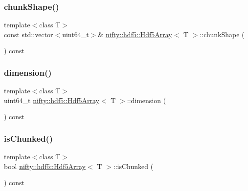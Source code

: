 \subsubsection{\texorpdfstring{chunk\+Shape()}{chunkShape()}\hspace{0.1cm}{\footnotesize\ttfamily [2/2]}}
{\footnotesize\ttfamily template$<$class T$>$ \\
const std\+::vector$<$uint64\+\_\+t$>$\& \hyperlink{classnifty_1_1hdf5_1_1Hdf5Array}{nifty\+::hdf5\+::\+Hdf5\+Array}$<$ T $>$\+::chunk\+Shape (\begin{DoxyParamCaption}{ }\end{DoxyParamCaption}) const\hspace{0.3cm}{\ttfamily [inline]}}

\mbox{\label{classnifty_1_1hdf5_1_1Hdf5Array_a4c5acf1a05db2bccd714c64a1389a287}} 
\subsubsection{\texorpdfstring{dimension()}{dimension()}}
{\footnotesize\ttfamily template$<$class T$>$ \\
uint64\+\_\+t \hyperlink{classnifty_1_1hdf5_1_1Hdf5Array}{nifty\+::hdf5\+::\+Hdf5\+Array}$<$ T $>$\+::dimension (\begin{DoxyParamCaption}{ }\end{DoxyParamCaption}) const\hspace{0.3cm}{\ttfamily [inline]}}

\mbox{\label{classnifty_1_1hdf5_1_1Hdf5Array_a4ae66ef4e9ba86c5f311c6476fb1b422}} 
\subsubsection{\texorpdfstring{is\+Chunked()}{isChunked()}}
{\footnotesize\ttfamily template$<$class T$>$ \\
bool \hyperlink{classnifty_1_1hdf5_1_1Hdf5Array}{nifty\+::hdf5\+::\+Hdf5\+Array}$<$ T $>$\+::is\+Chunked (\begin{DoxyParamCaption}{ }\end{DoxyParamCaption}) const\hspace{0.3cm}{\ttfamily [inline]}}


